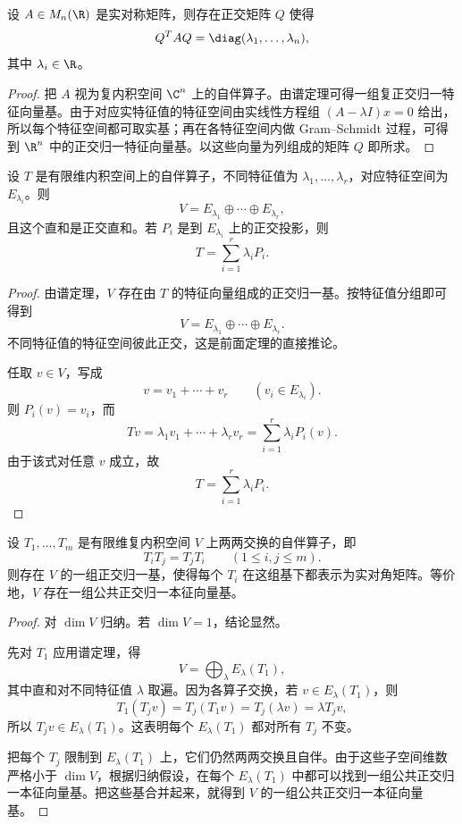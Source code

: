 \begin{corollary}[实对称矩阵的正交对角化]
设 $A\in M_n(\R)$ 是实对称矩阵，则存在正交矩阵 $Q$ 使得
\[
Q^TAQ=\diag(\lambda_1,\dots,\lambda_n),
\]
其中 $\lambda_i\in\R$。
\end{corollary}

\begin{proof}
把 $A$ 视为复内积空间 $\C^n$ 上的自伴算子。由谱定理可得一组复正交归一特征向量基。由于对应实特征值的特征空间由实线性方程组 $(A-\lambda I)x=0$ 给出，所以每个特征空间都可取实基；再在各特征空间内做 Gram--Schmidt 过程，可得到 $\R^n$ 中的正交归一特征向量基。以这些向量为列组成的矩阵 $Q$ 即所求。
\end{proof}

\begin{theorem}[谱分解]
设 $T$ 是有限维内积空间上的自伴算子，不同特征值为 $\lambda_1,\dots,\lambda_r$，对应特征空间为 $E_{\lambda_i}$。则
\[
V=E_{\lambda_1}\oplus\cdots\oplus E_{\lambda_r},
\]
且这个直和是正交直和。若 $P_i$ 是到 $E_{\lambda_i}$ 上的正交投影，则
\[
T=\sum_{i=1}^r \lambda_i P_i.
\]
\end{theorem}

\begin{proof}
由谱定理，$V$ 存在由 $T$ 的特征向量组成的正交归一基。按特征值分组即可得到
\[
V=E_{\lambda_1}\oplus\cdots\oplus E_{\lambda_r}.
\]
不同特征值的特征空间彼此正交，这是前面定理的直接推论。

任取 $v\in V$，写成
\[
v=v_1+\cdots+v_r\qquad (v_i\in E_{\lambda_i}).
\]
则 $P_i(v)=v_i$，而
\[
Tv=\lambda_1v_1+\cdots+\lambda_rv_r=\sum_{i=1}^r \lambda_i P_i(v).
\]
由于该式对任意 $v$ 成立，故
\[
T=\sum_{i=1}^r \lambda_i P_i.
\]
\end{proof}

\begin{theorem}[交换自伴算子的同时对角化]
设 $T_1,\dots,T_m$ 是有限维复内积空间 $V$ 上两两交换的自伴算子，即
\[
T_iT_j=T_jT_i\qquad (1\le i,j\le m).
\]
则存在 $V$ 的一组正交归一基，使得每个 $T_i$ 在这组基下都表示为实对角矩阵。等价地，$V$ 存在一组公共正交归一本征向量基。
\end{theorem}

\begin{proof}
对 $\dim V$ 归纳。若 $\dim V=1$，结论显然。

先对 $T_1$ 应用谱定理，得
\[
V=\bigoplus_{\lambda} E_{\lambda}(T_1),
\]
其中直和对不同特征值 $\lambda$ 取遍。因为各算子交换，若 $v\in E_{\lambda}(T_1)$，则
\[
T_1(T_jv)=T_j(T_1v)=T_j(\lambda v)=\lambda T_jv,
\]
所以 $T_jv\in E_{\lambda}(T_1)$。这表明每个 $E_{\lambda}(T_1)$ 都对所有 $T_j$ 不变。

把每个 $T_j$ 限制到 $E_{\lambda}(T_1)$ 上，它们仍然两两交换且自伴。由于这些子空间维数严格小于 $\dim V$，根据归纳假设，在每个 $E_{\lambda}(T_1)$ 中都可以找到一组公共正交归一本征向量基。把这些基合并起来，就得到 $V$ 的一组公共正交归一本征向量基。
\end{proof}

